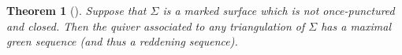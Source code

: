 \documentclass[11pt, letterpaper]{amsart}
\newtheorem{theorem}{Theorem}[section]
\theoremstyle{definition}
\numberwithin{equation}{section}
\begin{document}


\begin{theorem}[{\cite[Theorem~1.1]{MR3695872}}]
Suppose that $\Sigma$ is a \emph{marked surface} which is not once-punctured and closed. 
Then the quiver associated to any triangulation of $\Sigma$ has a maximal green sequence (and thus a reddening sequence).
\end{theorem}

\end{document}
